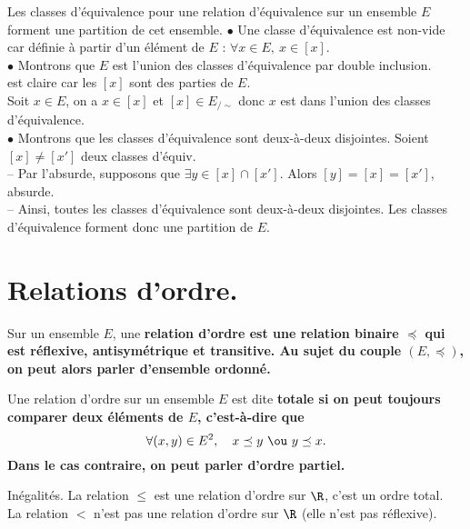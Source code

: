 \documentclass[11pt]{article}
\begin{document}
\begin{thm}{}{}
    Les classes d'équivalence pour une relation d'équivalence sur un ensemble $E$ forment une partition de cet ensemble.
    \tcblower
    $\bullet$ Une classe d'équivalence est non-vide car définie à partir d'un élément de $E$ : $\forall x \in E, ~ x\in[x]$.\\
    $\bullet$ Montrons que $E$ est l'union des classes d'équivalence par double inclusion.\\
    \boxed{\supset} est claire car les $[x]$ sont des parties de $E$.\\
    \boxed{\subset} Soit $x\in E$, on a $x\in[x]$ et $[x]\in E_{/\sim}$ donc $x$ est dans l'union des classes d'équivalence.\\
    $\bullet$ Montrons que les classes d'équivalence sont deux-à-deux disjointes. Soient $[x]\neq[x']$ deux classes d'équiv.\\
    -- Par l'absurde, supposons que $\exists y \in [x]\cap[x']$. Alors $[y]=[x]=[x']$, absurde.\\
    -- Ainsi, toutes les classes d'équivalence sont deux-à-deux disjointes.\n
    Les classes d'équivalence forment donc une partition de $E$.
\end{thm}

\section{Relations d'ordre.}

\begin{defi}{}{}
    Sur un ensemble $E$, une \bf{relation d'ordre} est une relation binaire $\preceq$ qui est réflexive, antisymétrique et transitive. Au sujet du couple $(E,\preceq)$, on peut alors parler d'ensemble ordonné. 
\end{defi}

\begin{defi}{}{}
    Une relation d'ordre sur un ensemble $E$ est dite \bf{totale} si on peut toujours comparer deux éléments de $E$, c'est-à-dire que
    \begin{equation*}
        \forall (x,y)\in E^2, \quad x \preceq y ~\ou~ y \preceq x.
    \end{equation*}
    Dans le cas contraire, on peut parler d'ordre \bf{partiel}.
\end{defi}

\begin{ex}{Inégalités.}{}
    La relation $\leq$ est une relation d'ordre sur $\R$, c'est un ordre total.\\
    La relation $<$ n'est pas une relation d'ordre sur $\R$ (elle n'est pas réflexive).
\end{ex}
\end{document}
